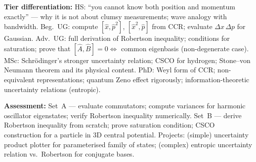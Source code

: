 \documentclass[11pt,a4paper]{article}
\begin{document}
\begin{tcolorbox}[modulebox, title={Module~I.3 --- Lecture L03: Uncertainty and Commutation Relations}]
\medskip\textbf{Tier differentiation:}
HS: ``you cannot know both position and momentum exactly'' --- why it is not
about clumsy measurements; wave analogy with bandwidth.
Beg.\ UG: compute $[\hat{x},\hat{p}^2]$, $[\hat{x}^2,\hat{p}]$ from CCR;
evaluate $\Delta x\,\Delta p$ for Gaussian.
Adv.\ UG: full derivation of Robertson inequality; conditions for saturation;
prove that $[\hat{A},\hat{B}]=0 \Leftrightarrow$ common eigenbasis (non-degenerate case).
MSc: Schr\"odinger's stronger uncertainty relation; CSCO for hydrogen;
Stone--von Neumann theorem and its physical content.
PhD: Weyl form of CCR; non-equivalent representations; quantum Zeno effect
rigorously; information-theoretic uncertainty relations (entropic).

\medskip\textbf{Assessment:}
Set~A --- evaluate commutators; compute variances for harmonic oscillator eigenstates;
verify Robertson inequality numerically.
Set~B --- derive Robertson inequality from scratch; prove saturation condition;
CSCO construction for a particle in 3D central potential.
Projects: (simple) uncertainty product plotter for parameterised family of states;
(complex) entropic uncertainty relation vs.\ Robertson for conjugate bases.
\end{tcolorbox}
\end{document}

